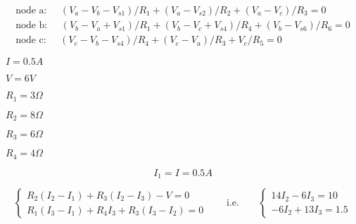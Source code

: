 {\newpage\clearpage
{}%
\begin{displaymath} \begin{array}{l}
    \mbox{node a:}\;\;\;\;\;(V_a-V_b-V_{s1})/R_1+(V_a-V_{s2})/R_2+(V_a-V_c)/R_3=0 \\
    \mbox{node b:}\;\;\;\;\;(V_b-V_a+V_{s1})/R_1+(V_b-V_c+V_{s4})/R_4+(V_b-V_{s6})/R_6=0 \\
    \mbox{node c:}\;\;\;\;\;(V_c-V_b-V_{s4})/R_4+(V_c-V_a)/R_3+V_c/R_5=0 
  \end{array} \end{displaymath}%
\lthtmldisplayZ
\lthtmlcheckvsize\clearpage}

{\newpage\clearpage
{}%
$I=0.5 A$%
\lthtmlinlinemathZ
\lthtmlcheckvsize\clearpage}

{\newpage\clearpage
{}%
$V=6 V$%
\lthtmlinlinemathZ
\lthtmlcheckvsize\clearpage}

{\newpage\clearpage
{}%
$R_1=3\Omega$%
\lthtmlinlinemathZ
\lthtmlcheckvsize\clearpage}

{\newpage\clearpage
{}%
$R_2=8\Omega$%
\lthtmlinlinemathZ
\lthtmlcheckvsize\clearpage}

{\newpage\clearpage
{}%
$R_3=6\Omega$%
\lthtmlinlinemathZ
\lthtmlcheckvsize\clearpage}

{\newpage\clearpage
{}%
$R_4=4\Omega$%
\lthtmlinlinemathZ
\lthtmlcheckvsize\clearpage}

{\newpage\clearpage
{}%
\begin{displaymath} I_1=I=0.5A \end{displaymath}%
\lthtmldisplayZ
\lthtmlcheckvsize\clearpage}

{\newpage\clearpage
{}%
\begin{displaymath} 
\left\{ \begin{array}{l} R_2(I_2-I_1)+R_3(I_2-I_3)-V=0 \\
  R_1(I_3-I_1)+R_4I_3+R_3(I_3-I_2)=0 \end{array} \right. 
\;\;\;\;\;\;\;\mbox{i.e.}\;\;\;\;\;\;\;
\left\{ \begin{array}{l}
  14 I_2-6 I_3=10 \\-6 I_2+13 I_3=1.5 \end{array} \right. 
\end{displaymath}%
\lthtmldisplayZ
\lthtmlcheckvsize\clearpage}

